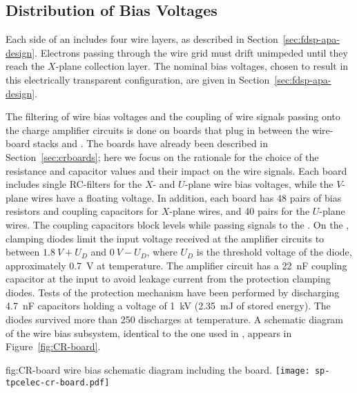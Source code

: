 \subsection{Distribution of Bias Voltages}
\label{sec:fdsp-tpcelec-design-bias}

Each side of an  includes four wire layers, as 
described in Section~\ref{sec:fdsp-apa-design}. Electrons passing 
through the wire grid must drift unimpeded until they reach 
the $X$-plane collection layer. The nominal bias voltages, chosen %
to result in this electrically transparent configuration, %
are given in Section~\ref{sec:fdsp-apa-design}. 

The filtering of wire bias voltages and the  coupling 
of wire signals passing onto the charge amplifier circuits is 
done on  boards that plug in between the  
wire-board stacks and . The  boards
have already been described in Section~\ref{sec:crboards};
here we focus on the rationale for the choice of the %
resistance and capacitor values and their impact on the
wire signals. Each  board includes single RC-filters 
for the $X$- and $U$-plane wire bias voltages, while the $V$-plane 
wires have a floating voltage. %
In addition, each board 
has \num{48} pairs of bias resistors and  coupling 
capacitors for $X$-plane wires, and \num{40} pairs for the $U$-plane 
wires. The coupling capacitors block  levels while passing  
signals to the . On the ,
clamping diodes limit the input voltage received at the amplifier
circuits to between $\SI{1.8}{V}+U_D$ and $\SI{0}{V}-U_D$, where $U_D$
is the threshold voltage of the diode, approximately \SI{0.7}{V} at  temperature.
The amplifier circuit has a \SI{22}{nF} coupling capacitor at the
input to avoid leakage current from the protection clamping diodes.
Tests of the protection mechanism have been performed by discharging
\SI{4.7}{nF} capacitors holding a voltage of \SI{1}{kV} (\SI{2.35}{mJ} of
stored energy). The diodes survived more than 250 discharges at \lntwo
temperature. A schematic diagram of the   wire bias 
subsystem, identical to the one used in , appears
in Figure~\ref{fig:CR-board}.

\begin{dunefigure}
{fig:CR-board}
{  wire bias schematic diagram including the  board.}
\texttt{[image: sp-tpcelec-cr-board.pdf]}
\end{dunefigure}

